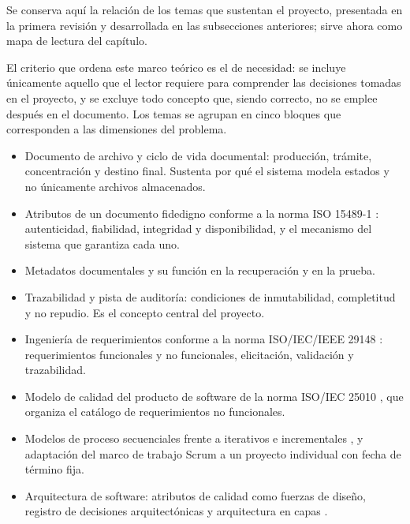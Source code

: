 Se conserva aquí la relación de los temas que sustentan el proyecto, presentada en la primera revisión y desarrollada en las subsecciones anteriores; sirve ahora como mapa de lectura del capítulo.

El criterio que ordena este marco teórico es el de necesidad: se incluye únicamente aquello que el lector requiere para comprender las decisiones tomadas en el proyecto, y se excluye todo concepto que, siendo correcto, no se emplee después en el documento. Los temas se agrupan en cinco bloques que corresponden a las dimensiones del problema.

\begin{description}[leftmargin=0pt,font=\bfseries,itemsep=0.6em,parsep=0pt]
  \item[Gestión documental y documentos de archivo.]\leavevmode
  \begin{itemize}[nosep,leftmargin=1.4em,topsep=1pt]
    \item Documento de archivo y ciclo de vida documental: producción, trámite, concentración y destino final. Sustenta por qué el sistema modela estados y no únicamente archivos almacenados.
    \item Atributos de un documento fidedigno conforme a la norma ISO 15489-1 \cite{iso15489}: autenticidad, fiabilidad, integridad y disponibilidad, y el mecanismo del sistema que garantiza cada uno.
    \item Metadatos documentales y su función en la recuperación y en la prueba.
    \item Trazabilidad y pista de auditoría: condiciones de inmutabilidad, completitud y no repudio. Es el concepto central del proyecto.
  \end{itemize}

  \item[Ingeniería de software.]\leavevmode
  \begin{itemize}[nosep,leftmargin=1.4em,topsep=1pt]
    \item Ingeniería de requerimientos conforme a la norma ISO/IEC/IEEE 29148 \cite{iso29148}: requerimientos funcionales y no funcionales, elicitación, validación y trazabilidad.
    \item Modelo de calidad del producto de software de la norma ISO/IEC 25010 \cite{iso25010}, que organiza el catálogo de requerimientos no funcionales.
    \item Modelos de proceso secuenciales frente a iterativos e incrementales \cite{sommerville2011, pressman2010}, y adaptación del marco de trabajo Scrum \cite{scrumguide2020} a un proyecto individual con fecha de término fija.
    \item Arquitectura de software: atributos de calidad como fuerzas de diseño, registro de decisiones arquitectónicas y arquitectura en capas \cite{bass2021}.
  \end{itemize}


\end{description}
